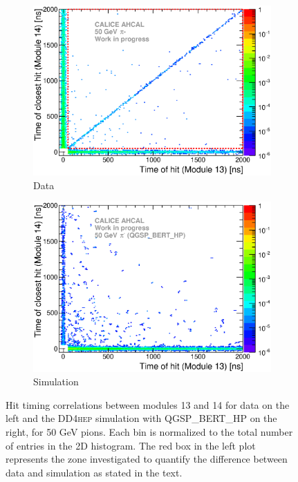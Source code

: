 \documentclass[12pt]{article}
\newcommand\ddhep{\textsc{DD4hep}\xspace}
\begin{document}
\begin{figure}[htbp!]
  \begin{subfigure}[t]{0.49\textwidth}
    \centering
    \includegraphics[width=1\textwidth]{../../Draft/fig/Time_Correlation_long.eps}
    \caption{Data} \label{fig:TimeCorr_Data_long_50GeV}
  \end{subfigure}
  \hfill
  \begin{subfigure}[t]{0.49\textwidth}
    \centering
    \includegraphics[width=1\textwidth]{../../Draft/fig/Time_Correlation_50GeV_long_QGSPBERTHP_DD4hep.eps}
    \caption{Simulation} \label{fig:TimeCorr_Data_long_50GeV_Sim}
  \end{subfigure}
  \caption{Hit timing correlations between modules 13 and 14 for data on the left and the \ddhep simulation with QGSP\_BERT\_HP on the right, for 50 GeV pions. Each bin is normalized to the total number of entries in the 2D histogram. The red box in the left plot represents the zone investigated to quantify the difference between data and simulation as stated in the text.}
  \label{fig:TimeCorr_long_50GeV}
\end{figure}
\end{document}
